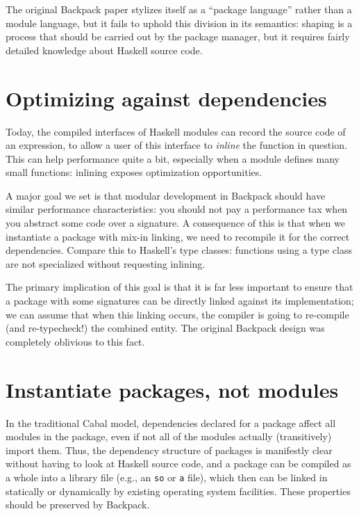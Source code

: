 The original Backpack paper stylizes itself as a ``package language''
rather than a module language, but it fails to uphold this division
in its semantics: shaping is a process that should be carried out
by the package manager, but it requires fairly detailed knowledge
about Haskell source code.

\section{Optimizing against dependencies}
\label{sec:optimizing}

Today, the compiled interfaces of Haskell modules can record the source
code of an expression, to allow a user of this interface to
\emph{inline} the function in question.  This can help performance quite
a bit, especially when a module defines many small functions: inlining
exposes optimization opportunities.

A major goal we set is that modular development in Backpack should have
similar performance characteristics: you should not pay a performance
tax when you abstract some code over a signature.  A consequence of this
is that when we instantiate a package with mix-in linking, we need to
recompile it for the correct dependencies.  Compare this to Haskell's
type classes: functions using a type class are not specialized without
requesting inlining.

The primary implication of this goal is that it is far less important to
ensure that a package with some signatures can be directly linked
against its implementation; we can assume that when this linking occurs,
the compiler is going to re-compile (and re-typecheck!) the combined
entity.  The original Backpack design was completely oblivious to this fact.

\section{Instantiate packages, not modules}
\label{sec:instantiate-pkgs}

In the traditional Cabal model, dependencies declared for a package
affect all modules in the package, even if not all of the modules
actually (transitively) import them.  Thus, the dependency structure of
packages is manifestly clear without having to look at Haskell source
code, and a package can be compiled as a whole into a library file
(e.g., an \verb|so| or \verb|a| file), which then can be linked in
statically or dynamically by existing operating system facilities.
These properties should be preserved by Backpack.

